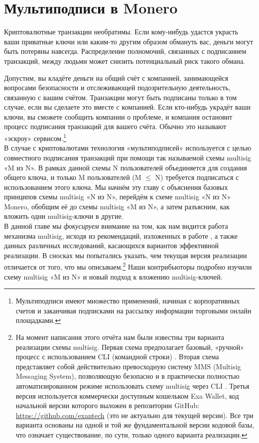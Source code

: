 \chapter{Мультиподписи в Monero}
\label{chapter:multisignatures}

Криптовалютные транзакции необратимы. Если кому-нибудь удастся украсть ваши приват\-ные ключи или каким-то другим образом обмануть вас, деньги могут быть потеряны навсегда. Распределение полномочий, связанных с подписанием транзакций, между людьми может снизить потенциальный риск такого обмана.

Допустим, вы кладёте деньги на общий счёт с компанией, занимающейся вопросами безопас\-ности и отслеживающей подозрительную деятельность, связанную с вашим счётом. Транзак\-ции могут быть подписаны только в том случае, если вы сделаете это вместе с компанией. Если кто-нибудь украдёт ваши ключи, вы сможете сообщить компании о проблеме, и компа\-ния остановит процесс подписания транзакций для вашего счёта. Обычно это называют «эскроу» сервисом.\footnote{Мультиподписи имеют множество применений, начиная с корпоративных счетов и заканчивая подписками на рассылку информации торговыми онлайн площадками.}\\

В случае с криптовалютами технология «мультиподписей» используется с целью совместного подписания транзакций при помощи так называемой схемы multisig «M из N». В рамках данной схемы N пользователей объединяется для создания общего ключа, и только M пользо\-вателей (M $\leq$ N) требуется подписаться с использованием этого ключа. Мы начнём эту главу с объяснения базовых принципов схемы multisig «N из N», перейдём к схеме multisig «N из N» Monero, обобщим её до схемы multisig «M из N», а затем разъясним, как вложить одни multisig-ключи в другие.\\

В данной главе мы {\em фокусируем} внимание на том, как нам видится работа механизма multisig, исходя из рекомендаций, изложенных в работе \cite{MRL-0009-multisig}, а также данных различных исследований, касающихся вариантов эффективной реализации. В сносках мы попытались указать, чем текущая версия реализации отличается от того, что мы описываем.\footnote{На момент написания этого отчёта нам были известны три варианта реализации схемы multisig. Первая схема предполагает базовый, «ручной» процесс с использованием CLI (командной строки) \cite{cli-22multisig-instructions}. Вторая схема представляет собой действительно превосходную систему MMS (Multisig Messaging System), позволяющую безопасно и в практически полностью автоматизированном режиме использовать схему multisig через CLI \cite{mms-manual, mms-project-proposal}. Третья версия используется коммерчески доступным кошельком Exa Wallet, код начальной версии которого выложен в репозитории GitHub: \url{https://github.com/exantech} (это не актуально для текущей версии). Все три варианта основаны на одной и той же фундаментальной версии кодовой базы, что означает существование, по сути, только одного варианта реализации.} Наши контрибьюторы подробно изучили схему multisig «M из N» и новый подход к вложению multisig-ключей.



